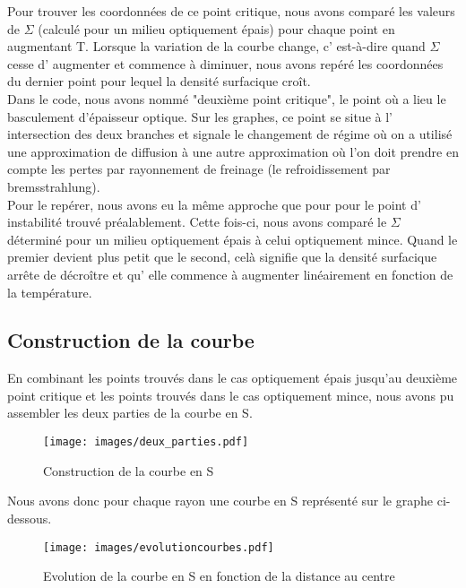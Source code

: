 Pour trouver les coordonnées de ce point critique, nous avons comparé les valeurs de $\Sigma$ (calculé pour un milieu optiquement épais) pour chaque point en augmentant T. Lorsque la variation de la courbe change, c' est-à-dire quand $\Sigma$ cesse d' augmenter et commence à diminuer, nous avons repéré les coordonnées du dernier point pour lequel la densité surfacique croît.  
\\
Dans le code, nous avons nommé "deuxième point critique", le point où a lieu le basculement d'épaisseur optique. Sur les graphes, ce point se situe à l' intersection des deux branches et signale le changement de régime où on a utilisé une approximation de diffusion à une autre approximation où l'on doit prendre en compte les pertes par rayonnement de freinage (le refroidissement par bremsstrahlung).
\\
Pour le repérer, nous avons eu la même approche que pour pour le point d' instabilité trouvé préalablement. Cette fois-ci, nous avons comparé le $\Sigma$ déterminé pour un milieu optiquement épais à celui optiquement mince. Quand le premier devient plus petit que le second, celà signifie que la densité surfacique arrête de décroître et qu' elle commence à augmenter linéairement en fonction de la température. 
\\
[courbe en S avec les points légendés + ?evolution en fonction de r ?]

\subsection{Construction de la courbe}

En combinant les points trouvés dans le cas optiquement épais jusqu'au deuxième point critique et les points trouvés dans le cas optiquement mince, nous avons pu assembler les deux parties de la courbe en S.

\begin{figure}[htb!]
	\centering
	\texttt{[image: images/deux\_parties.pdf]}
	\caption{Construction de la courbe en S}
	\label{Fig::bench}
\end{figure}
\FloatBarrier

Nous avons donc pour chaque rayon une courbe en S représenté sur le graphe ci-dessous.
\begin{figure}[htb!]
	\centering
	\texttt{[image: images/evolutioncourbes.pdf]}
	\caption{Evolution de la courbe en S en fonction de la distance au centre}
	\label{Fig::bench}
\end{figure}
\FloatBarrier


